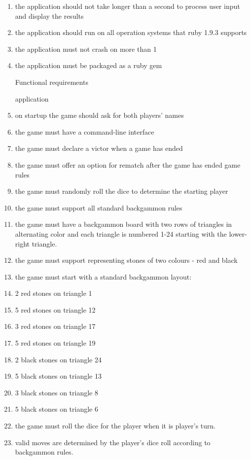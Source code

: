 \documentclass[11pt]{article}
\begin{document}
\begin{enumerate}[I]
\item the application should not take longer than a second to process user input and display the results

\item the application should run on all operation systems that ruby 1.9.3 supports
\item the application must not crash on more than 1%
\item the application must be packaged as a ruby gem

Functional requirements

application
\item on startup the game should ask for both players' names
\item the game must have a command-line interface
\item the game must declare a victor when a game has ended
\item the game must offer an option for rematch after the game has ended
game rules
\item the game must randomly roll the dice to determine the starting player
\item the game must support all standard backgammon rules
\item the game must have a backgammon board with two rows of triangles in alternating color and each triangle is numbered 1-24 starting with the lower-right triangle.
\item the game must support representing stones of two colours - red and black
\item the game must start with a standard backgammon layout:

\item 2 red stones on triangle 1
\item 5 red stones on triangle 12
\item 3 red stones on triangle 17
\item 5 red stones on triangle 19
\item 2 black stones on triangle 24
\item 5 black stones on triangle 13
\item 3 black stones on triangle 8
\item 5 black stones on triangle 6

\item the game must roll the dice for the player when it is player's turn.
\item valid moves are determined by the player's dice roll according to backgammon rules.


\end{enumerate}
\end{document}
